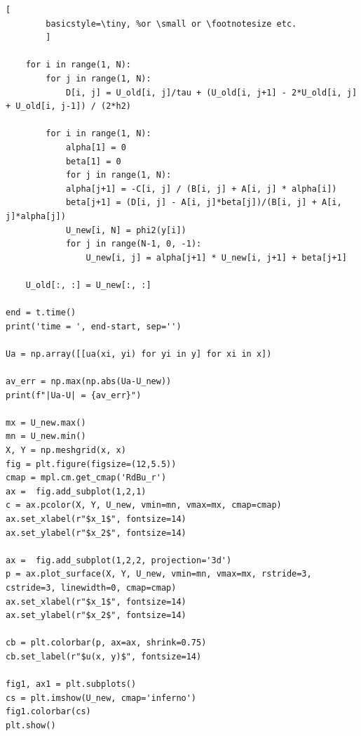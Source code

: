 \documentclass[a4paper, 12pt]{article}
\begin{document}
\begin{lstlisting}[
		basicstyle=\tiny, %or \small or \footnotesize etc.
		]
	
	for i in range(1, N):
		for j in range(1, N):
			D[i, j] = U_old[i, j]/tau + (U_old[i, j+1] - 2*U_old[i, j] + U_old[i, j-1]) / (2*h2)
		
		for i in range(1, N):
			alpha[1] = 0
			beta[1] = 0 
			for j in range(1, N):
			alpha[j+1] = -C[i, j] / (B[i, j] + A[i, j] * alpha[i])
			beta[j+1] = (D[i, j] - A[i, j]*beta[j])/(B[i, j] + A[i, j]*alpha[j])
			U_new[i, N] = phi2(y[i])
			for j in range(N-1, 0, -1):
				U_new[i, j] = alpha[j+1] * U_new[i, j+1] + beta[j+1]
		
	U_old[:, :] = U_new[:, :]

end = t.time()
print('time = ', end-start, sep='')

Ua = np.array([[ua(xi, yi) for yi in y] for xi in x])

av_err = np.max(np.abs(Ua-U_new))
print(f"|Ua-U| = {av_err}")

mx = U_new.max()
mn = U_new.min()
X, Y = np.meshgrid(x, x)
fig = plt.figure(figsize=(12,5.5))
cmap = mpl.cm.get_cmap('RdBu_r')
ax =  fig.add_subplot(1,2,1)
c = ax.pcolor(X, Y, U_new, vmin=mn, vmax=mx, cmap=cmap)
ax.set_xlabel(r"$x_1$", fontsize=14)
ax.set_ylabel(r"$x_2$", fontsize=14)

ax =  fig.add_subplot(1,2,2, projection='3d')
p = ax.plot_surface(X, Y, U_new, vmin=mn, vmax=mx, rstride=3, cstride=3, linewidth=0, cmap=cmap)
ax.set_xlabel(r"$x_1$", fontsize=14)
ax.set_ylabel(r"$x_2$", fontsize=14)

cb = plt.colorbar(p, ax=ax, shrink=0.75)
cb.set_label(r"$u(x, y)$", fontsize=14)

fig1, ax1 = plt.subplots()
cs = plt.imshow(U_new, cmap='inferno')
fig1.colorbar(cs)
plt.show()
	\end{lstlisting}
\end{document}
